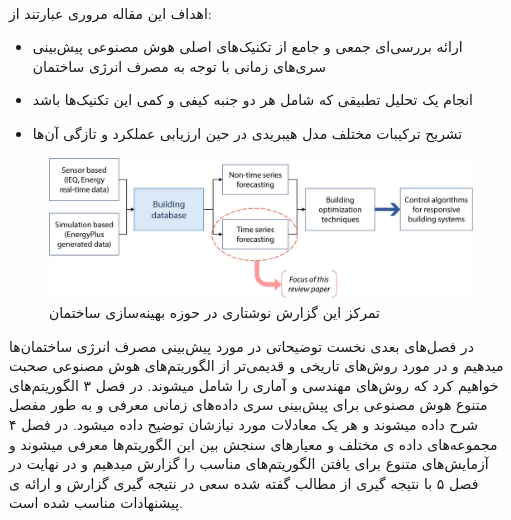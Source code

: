 \\[3em]
\noindent
اهداف این مقاله مروری عبارتند از:
\begin{itemize}
    \item ارائه بررسی‌ای جمعی و جامع از تکنیک‌های اصلی هوش مصنوعی پیش‌بینی سری‌های ‌ز‌‌مانی با توجه به مصرف انرژی ساختمان
    \item انجام یک تحلیل تطبیقی که شامل هر دو جنبه کیفی و کمی این تکنیک‌ها باشد
    \item تشریح ترکیبات مختلف مدل هیبریدی در حین ارزیابی عملکرد و تازگی آن‌ها
\end{itemize}

\begin{figure}[ht!]
    \begin{center}
        \includegraphics[width=14cm]{images/illustration.jpg}
    \end{center}
    \caption[‌اهمیت پیش‌بینی انرژی ساختمان‌ها برای بهینه سازی ساختمان‌ها]{تمرکز این گزارش نوشتاری در حوزه بهینه‌سازی ساختمان
     \cite{DEB2017902}}
    \label{fig:dc}
    \end{figure}

    \noindent
در فصل‌های بعدی نخست توضیحاتی در مورد پیش‌بینی مصرف انرژی ساختمان‌ها میدهیم و در مورد روش‌های تاریخی و قدیمی‌تر از 
الگوریتم‌های هوش‌ مصنوعی صحبت خواهیم کرد که روش‌های مهندسی و آماری را شامل میشوند. در فصل ۳ الگوریتم‌های متنوع هوش مصنوعی برای پیش‌بینی سری داده‌های زمانی معرفی و به طور مفصل شرح داده میشوند و هر یک 
معادلات مورد نیازشان توضیح داده میشود. در فصل ۴ مجموعه‌های داده ی مختلف و معیار‌های سنجش بین این الگوریتم‌ها معرفی میشوند و آزمایش‌های متنوع 
برای یافتن الگوریتم‌های مناسب را گزارش میدهیم و در نهایت در فصل ۵ با نتیجه گیری از مطالب گفته شده سعی در نتیجه گیری گزارش و ارائه ی پیشنهادات مناسب شده است.
